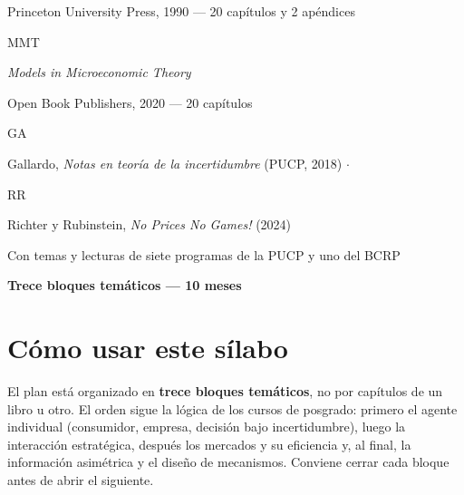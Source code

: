 \documentclass[11pt,a4paper]{article}
\newcommand{\etiqueta}[2]{%
  {\setlength{\fboxsep}{1.4pt}\colorbox{#1}{\sffamily\bfseries\color{white}\strut#2}}}
\begin{document}
\begin{titlepage}
{\small\color{tonoPizarra} Princeton University Press, 1990 --- 20 capítulos y 2 apéndices\par}
\vspace{0.25cm}
{\large\etiqueta{colorMMT}{MMT} \par}
{\normalsize \emph{\color{colorMMT}Models in Microeconomic Theory}\par}
{\small\color{tonoPizarra} Open Book Publishers, 2020 --- 20 capítulos\par}
\vspace{0.35cm}
{\small\etiqueta{colorGA}{GA} \quad Gallardo, \emph{Notas en teoría de la incertidumbre} (PUCP, 2018)
\quad $\cdot$ \quad \etiqueta{colorRR}{RR} \quad Richter y Rubinstein, \emph{No Prices No Games!} (2024)\par}
\vspace{0.35cm}
{\normalsize\color{colorPUCP} Con temas y lecturas de siete programas de la PUCP y uno del BCRP\par}
\vfill
{\setlength{\fboxsep}{6pt}\colorbox{tonoPrincipal}{\normalsize\sffamily\bfseries\color{white} Trece bloques temáticos --- 10 meses}\par}
\vspace{0.2cm}
\end{titlepage}

\tableofcontents
\newpage

\section*{Cómo usar este sílabo}

El plan está organizado en \textbf{trece bloques temáticos}, no por capítulos
de un libro u otro. El orden sigue la lógica de
los cursos de posgrado: primero el agente individual (consumidor, empresa,
decisión bajo incertidumbre), luego la interacción estratégica, después los
mercados y su eficiencia y, al final, la información asimétrica y el diseño de
mecanismos. Conviene cerrar cada bloque antes de abrir el siguiente.
\end{document}
